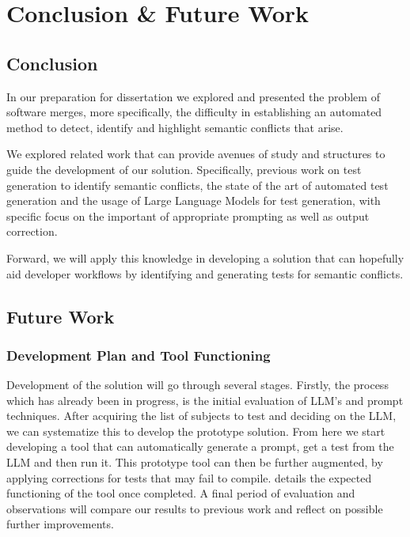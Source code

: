 \chapter{Conclusion \& Future Work}\label{chap:conclusion}

\section{Conclusion}

In our preparation for dissertation we explored and presented the problem of software merges, more specifically, the difficulty in establishing an automated method to detect, identify and highlight semantic conflicts that arise.

We explored related work that can provide avenues of study and structures to guide the development of our solution. Specifically, previous work on test generation to identify semantic conflicts, the state of the art of automated test generation and the usage of Large Language Models for test generation, with specific focus on the important of appropriate prompting as well as output correction.

Forward, we will apply this knowledge in developing a solution that can hopefully aid developer workflows by identifying and generating tests for semantic conflicts.

\section{Future Work}

\subsection{Development Plan and Tool Functioning}

Development of the solution will go through several stages. Firstly, the process which has already been in progress, is the initial evaluation of LLM's and prompt techniques. After acquiring the list of subjects to test and deciding on the LLM, we can systematize this to develop the prototype solution. From here we start developing a tool that can automatically generate a prompt, get a test from the LLM and then run it. This prototype tool can then be further augmented, by applying corrections for tests that may fail to compile.  details the expected functioning of the tool once completed. A final period of evaluation and observations will compare our results to previous work and reflect on possible further improvements.

